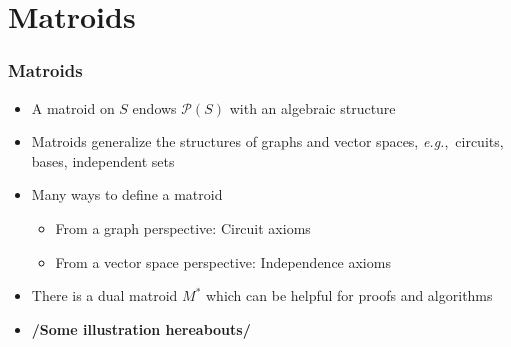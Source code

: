 \documentclass[bigger]{beamer}
\newcommand{\eg}{{\em e.g.},~}
\begin{document}
\section{Matroids}



\begin{frame}
\frametitle{Matroids}
\begin{itemize}


\item A matroid on $S$ endows $\mathcal{P}(S)$ with an algebraic
  structure 
\item Matroids generalize the structures of graphs and vector spaces,
  \eg circuits, bases, independent sets
\item Many ways to define a matroid
  \begin{itemize}
  \item From a graph perspective: Circuit axioms
  \item From a vector space perspective: Independence axioms
  \end{itemize}
\item There is a dual matroid $M^*$ which can be helpful for proofs and algorithms 
\item \textbf{/Some illustration hereabouts/}
\end{itemize} %
\end{frame}








\end{document}
